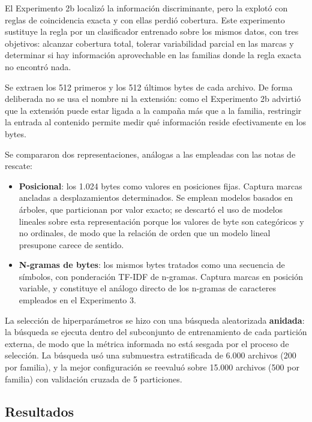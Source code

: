 El Experimento 2b localizó la información discriminante, pero la explotó con reglas de coincidencia exacta y con ellas perdió cobertura. Este experimento sustituye la regla por un clasificador entrenado sobre los mismos datos, con tres objetivos: alcanzar cobertura total, tolerar variabilidad parcial en las marcas y determinar si hay información aprovechable en las familias donde la regla exacta no encontró nada.

Se extraen los 512 primeros y los 512 últimos bytes de cada archivo. De forma deliberada no se usa el nombre ni la extensión: como el Experimento 2b advirtió que la extensión puede estar ligada a la campaña más que a la familia, restringir la entrada al contenido permite medir qué información reside efectivamente en los bytes.

Se compararon dos representaciones, análogas a las empleadas con las notas de rescate:

\begin{itemize}
\item \textbf{Posicional}: los 1.024 bytes como valores en posiciones fijas. Captura marcas ancladas a desplazamientos determinados. Se emplean modelos basados en árboles, que particionan por valor exacto; se descartó el uso de modelos lineales sobre esta representación porque los valores de byte son categóricos y no ordinales, de modo que la relación de orden que un modelo lineal presupone carece de sentido.
\item \textbf{N-gramas de bytes}: los mismos bytes tratados como una secuencia de símbolos, con ponderación TF-IDF de n-gramas. Captura marcas en posición variable, y constituye el análogo directo de los n-gramas de caracteres empleados en el Experimento 3.
\end{itemize}

La selección de hiperparámetros se hizo con una búsqueda aleatorizada \textbf{anidada}: la búsqueda se ejecuta dentro del subconjunto de entrenamiento de cada partición externa, de modo que la métrica informada no está sesgada por el proceso de selección. La búsqueda usó una submuestra estratificada de 6.000 archivos (200 por familia), y la mejor configuración se reevaluó sobre 15.000 archivos (500 por familia) con validación cruzada de 5 particiones.

\subsection{Resultados}

